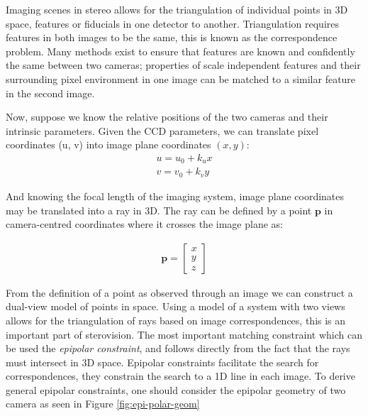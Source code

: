 

Imaging scenes in stereo allows for the triangulation of individual points in 3D space, features or fiducials in one detector to another.
Triangulation requires features in both images to be the same, this is known as the correspondence problem.
Many methods exist to ensure that features are known and confidently the same between two cameras; properties of scale independent features and their surrounding pixel environment in one image can be matched to a similar feature in the second image.

Now, suppose we know the relative positions of the two cameras and their intrinsic parameters.
Given the CCD parameters, we can translate pixel coordinates (u, v) into image plane coordinates $(x, y)$:
\begin{align}
    u = u_0 + k_u x \\
    v = v_0 + k_v y
\end{align}

And knowing the focal length of the imaging system, image plane coordinates may be translated into a ray in 3D.
The ray can be defined by a point $\textbf{p}$ in camera-centred coordinates where it crosses the image plane as:

\begin{align}
  \mathbf{p} = \begin{bmatrix}
        x\\y\\z
      \end{bmatrix}
\end{align}

From the definition of a point as observed through an image we can construct a dual-view model of points in space.
Using a model of a system with two views allows for the triangulation of rays based on image correspondences, this is an important part of sterovision.
The most important matching constraint which can be used the \emph{epipolar constraint}, and follows directly from the fact that the rays must intersect in 3D space.
Epipolar constraints facilitate the search for correspondences, they constrain the search to a 1D line in each image.
To derive general epipolar constraints, one should consider the epipolar geometry of two camera as seen in Figure \ref{fig:epi-polar-geom}


